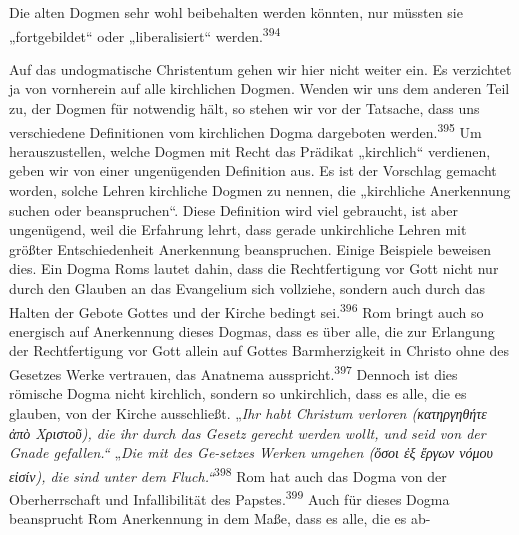 Die alten Dogmen sehr wohl beibehalten werden könnten, nur müssten sie „fortgebildet“ oder „liberalisiert“ werden.\textsuperscript{394}

Auf das undogmatische Christentum gehen wir hier nicht weiter ein. Es verzichtet ja von vornherein auf alle kirchlichen Dogmen. Wenden wir uns dem anderen Teil zu, der Dogmen für notwendig hält, so stehen wir vor der Tatsache, dass uns verschiedene Definitionen vom kirchlichen Dogma dargeboten werden.\textsuperscript{395} Um herauszustellen, welche Dogmen mit Recht das Prädikat „kirchlich“ verdienen, geben wir von einer ungenügenden Definition aus. Es ist der Vorschlag gemacht worden, solche Lehren kirchliche Dogmen zu nennen, die „kirchliche Anerkennung suchen oder beanspruchen“. Diese Definition wird viel gebraucht, ist aber ungenügend, weil die Erfahrung lehrt, dass gerade unkirchliche Lehren mit größter Entschiedenheit Anerkennung beanspruchen. Einige Beispiele beweisen dies. Ein Dogma Roms lautet dahin, dass die Rechtfertigung vor Gott nicht nur durch den Glauben an das Evangelium sich vollziehe, sondern auch durch das Halten der Gebote Gottes und der Kirche bedingt sei.\textsuperscript{396} Rom bringt auch so energisch auf Anerkennung dieses Dogmas, dass es über alle, die zur Erlangung der Rechtfertigung vor Gott allein auf Gottes Barmherzigkeit in Christo ohne des Gesetzes Werke vertrauen, das Anatnema ausspricht.\textsuperscript{397} Dennoch ist dies römische Dogma nicht kirchlich, sondern so unkirchlich, dass es alle, die es glauben, von der Kirche ausschließt. „\emph{Ihr habt Christum verloren (\textgreek{κατηργηθήτε ἀπὸ Χριστοῦ}), die ihr durch das Gesetz gerecht werden wollt, und seid von der Gnade gefallen.“} „\emph{Die mit des Ge-setzes Werken umgehen (\textgreek{ὅσοι ἐξ ἔργων νόμου εἰσίν}), die sind unter dem Fluch.“}\textsuperscript{398} Rom hat auch das Dogma von der Oberherrschaft und Infallibilität des Papstes.\textsuperscript{399} Auch für dieses Dogma beansprucht Rom Anerkennung in dem Maße, dass es alle, die es ab-

